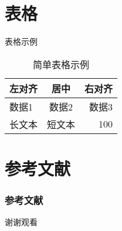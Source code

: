 \documentclass{beamer}
\begin{document}
\section{表格}
\begin{frame}{表格示例}
  \begin{table}
    \centering
    \begin{tabular}{l|c|r}
      \toprule
      左对齐 & 居中 & 右对齐 \\
      \midrule
      数据1 & 数据2 & 数据3 \\
      长文本 & 短文本 & 100 \cite{ctex2020manual}\\
      \bottomrule
    \end{tabular}
    \caption{简单表格示例}
  \end{table}
\end{frame}

\section{参考文献}

\begin{frame}
  \frametitle{参考文献}
  
  
\end{frame}

\begin{frame}
  \centering
  \LARGE 谢谢观看

\end{frame}
\end{document}
